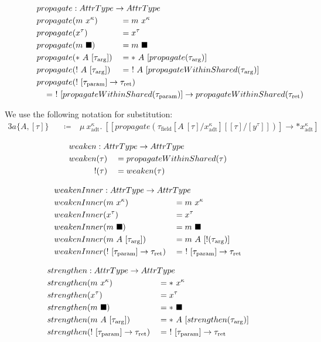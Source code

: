 \begin{alignat*}{3}
  propagate &: \mathrlap{AttrType \to AttrType} \\
  propagate&(m\ x^\kappa) &&= m\ x^\kappa \\
  propagate&(x^\tau) &&= x^\tau \\
  propagate&(m\ \blacksquare) &&= m\ \blacksquare \\
  propagate&(*\ A\ [\tau_\text{arg}]) &&= *\ A\ [propagate(\tau_\text{arg})] \\
  propagate&(!\ A\ [\tau_\text{arg}]) &&= \ !\ A\ [propagateWithinShared(\tau_\text{arg})] \\
  propagate&\mathrlap{(!\ [\tau_\text{param}] \to \tau_\text{ret})} \\
  \mathclap{\hspace{25em}= \ !\ [propagateWithinShared(\tau_\text{param})] \to propagateWithinShared(\tau_\text{ret})}
\end{alignat*}

We use the following notation for substitution:
\begin{alignat*}{3}
  a\{A, [\tau]\}\ &&\coloneqq&\ \mu\ x^\kappa_\text{adt}.\ [[propagate(\tau_\text{field}[A\ [\tau]/x^\kappa_\text{adt}][[\tau]/[y^\tau]])] \to *x^\kappa_\text{adt}]
\end{alignat*}


\begin{alignat*}{3}
  weaken &: \mathrlap{AttrType \to AttrType} \\
  weaken&(\tau) &&= propagateWithinShared(\tau) \\
  !&(\tau) &&= weaken(\tau)
\end{alignat*}

\begin{alignat*}{3}
	weakenInner &: \mathrlap{AttrType \to AttrType} \\
	weakenInner&(m\ x^\kappa) &&= m\ x^\kappa \\
	weakenInner&(x^\tau) &&= x^\tau \\
	weakenInner&(m\ \blacksquare) &&= m\ \blacksquare \\
	weakenInner&(m\ A\ [\tau_\text{arg}]) &&= m\ A\ [!(\tau_\text{arg})] \\
	weakenInner&(!\ [\tau_\text{param}] \to \tau_\text{ret}) &&=\ !\ [\tau_\text{param}] \to \tau_\text{ret} \\
\end{alignat*}

\begin{alignat*}{3}
  strengthen &: \mathrlap{AttrType \to AttrType} \\
  strengthen&(m\ x^\kappa) &&= *\ x^\kappa \\
  strengthen&(x^\tau) &&= x^\tau \\
  strengthen&(m\ \blacksquare) &&= *\ \blacksquare \\
  strengthen&(m\ A\ [\tau_\text{arg}]) &&= *\ A\ [strengthen(\tau_\text{arg})] \\
  strengthen&(!\ [\tau_\text{param}] \to \tau_\text{ret}) &&=\ !\ [\tau_\text{param}] \to \tau_\text{ret} \\
\end{alignat*}

